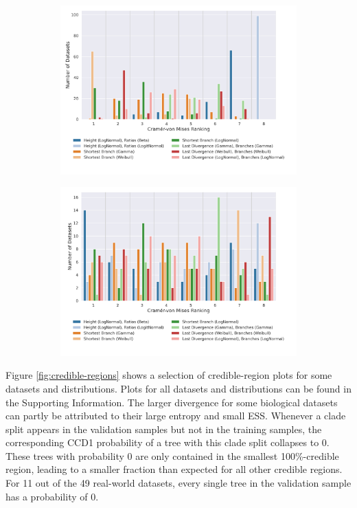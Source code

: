 \documentclass[10pt,letterpaper]{article}
\begin{document}
\begin{figure}
	\begin{subfigure}[b]{0.45\textwidth}
		\centering
		\includegraphics[width=\textwidth]{figures/yule-400-ccd1-cvm-ranking.png}
	\end{subfigure}
	\begin{subfigure}[b]{0.45\textwidth}
		\centering
		\includegraphics[width=\textwidth]{figures/bio-ccd1-cvm-ranking.png}
	\end{subfigure}
	
	\label{fig:cramer-von-mises-ranking}
\end{figure}

Figure \ref{fig:credible-regions} shows a selection of credible-region plots for some datasets and distributions. Plots for all datasets and distributions can be found in the Supporting Information. The larger divergence for some biological datasets can partly be attributed to their large entropy and small ESS. Whenever a clade split appears in the validation samples but not in the training samples, the corresponding CCD1 probability of a tree with this clade split collapses to $0$. These trees with probability $0$ are only contained in the smallest 100\%-credible region, leading to a smaller fraction than expected for all other credible regions. For 11 out of the 49 real-world datasets, every single tree in the validation sample has a probability of $0$.
\end{document}

